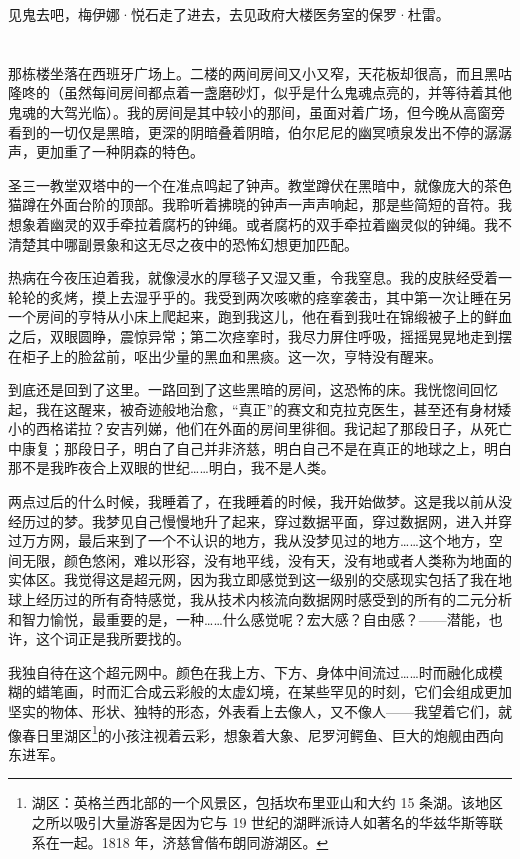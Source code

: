 \documentclass[AutoFakeBold=true]{book}
\begin{document}
{\kaishu 见鬼去吧}，梅伊娜·悦石走了进去，去见政府大楼医务室的保罗·杜雷。

\chapter{}

那栋楼坐落在西班牙广场上。二楼的两间房间又小又窄，天花板却很高，而且黑咕隆咚的（虽然每间房间都点着一盏磨砂灯，似乎是什么鬼魂点亮的，并等待着其他鬼魂的大驾光临）。我的房间是其中较小的那间，虽面对着广场，但今晚从高窗旁看到的一切仅是黑暗，更深的阴暗叠着阴暗，伯尔尼尼的幽冥喷泉发出不停的潺潺声，更加重了一种阴森的特色。

圣三一教堂双塔中的一个在准点鸣起了钟声。教堂蹲伏在黑暗中，就像庞大的茶色猫蹲在外面台阶的顶部。我聆听着拂晓的钟声一声声响起，那是些简短的音符。我想象着幽灵的双手牵拉着腐朽的钟绳。或者腐朽的双手牵拉着幽灵似的钟绳。我不清楚其中哪副景象和这无尽之夜中的恐怖幻想更加匹配。

热病在今夜压迫着我，就像浸水的厚毯子又湿又重，令我窒息。我的皮肤经受着一轮轮的炙烤，摸上去湿乎乎的。我受到两次咳嗽的痉挛袭击，其中第一次让睡在另一个房间的亨特从小床上爬起来，跑到我这儿，他在看到我吐在锦缎被子上的鲜血之后，双眼圆睁，震惊异常；第二次痉挛时，我尽力屏住呼吸，摇摇晃晃地走到摆在柜子上的脸盆前，呕出少量的黑血和黑痰。这一次，亨特没有醒来。

到底还是回到了这里。一路回到了这些黑暗的房间，这恐怖的床。我恍惚间回忆起，我在这醒来，被奇迹般地治愈，``真正''的赛文和克拉克医生，甚至还有身材矮小的西格诺拉？安吉列娣，他们在外面的房间里徘徊。我记起了那段日子，从死亡中康复；那段日子，明白了自己并非济慈，明白自己不是在真正的地球之上，明白那不是我昨夜合上双眼的世纪……明白，我不是人类。

\vspace*{1em}

两点过后的什么时候，我睡着了，在我睡着的时候，我开始做梦。这是我以前从没经历过的梦。我梦见自己慢慢地升了起来，穿过数据平面，穿过数据网，进入并穿过万方网，最后来到了一个不认识的地方，我从没梦见过的地方……这个地方，空间无限，颜色悠闲，难以形容，没有地平线，没有天，没有地或者人类称为地面的实体区。我觉得这是超元网，因为我立即感觉到这一级别的交感现实包括了我在地球上经历过的所有奇特感觉，我从技术内核流向数据网时感受到的所有的二元分析和智力愉悦，最重要的是，一种……什么感觉呢？宏大感？自由感？——潜能，也许，这个词正是我所要找的。

我独自待在这个超元网中。颜色在我上方、下方、身体中间流过……时而融化成模糊的蜡笔画，时而汇合成云彩般的太虚幻境，在某些罕见的时刻，它们会组成更加坚实的物体、形状、独特的形态，外表看上去像人，又不像人——我望着它们，就像春日里湖区\footnote{湖区：英格兰西北部的一个风景区，包括坎布里亚山和大约 15 条湖。该地区之所以吸引大量游客是因为它与 19 世纪的湖畔派诗人如著名的华兹华斯等联系在一起。1818 年，济慈曾偕布朗同游湖区。}的小孩注视着云彩，想象着大象、尼罗河鳄鱼、巨大的炮舰由西向东进军。
\end{document}
